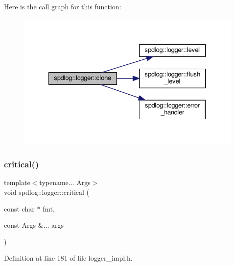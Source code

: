Here is the call graph for this function\+:
\nopagebreak
\begin{figure}[H]
\begin{center}
\leavevmode
\includegraphics[width=327pt]{classspdlog_1_1logger_a649a3c1a1b380e2488a93f9c3ae694de_cgraph}
\end{center}
\end{figure}
\mbox{\label{classspdlog_1_1logger_a3d11416764fe7ead94868d4c6438f583}} 
\subsubsection{\texorpdfstring{critical()}{critical()}\hspace{0.1cm}{\footnotesize\ttfamily [1/2]}}
{\footnotesize\ttfamily template$<$typename... Args$>$ \\
void spdlog\+::logger\+::critical (\begin{DoxyParamCaption}\item[{const char $\ast$}]{fmt,  }\item[{const Args \&...}]{args }\end{DoxyParamCaption})\hspace{0.3cm}{\ttfamily [inline]}}



Definition at line 181 of file logger\+\_\+impl.\+h.

